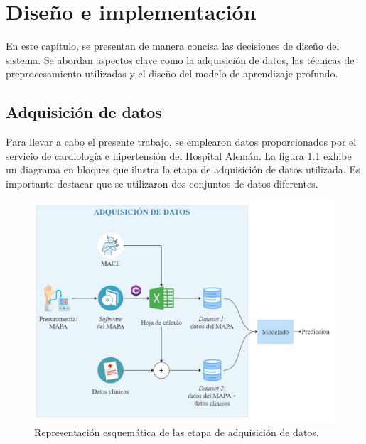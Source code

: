 \chapter{Diseño e implementación} %

\label{Chapter3} %

En este capítulo, se presentan de manera concisa las decisiones de diseño del sistema. 
Se abordan aspectos clave como la adquisición de datos, las técnicas de preprocesamiento 
utilizadas y el diseño del modelo de aprendizaje profundo. 

\section{Adquisición de datos}
 
\newcommand{\myhash}{\raisebox{\depth}{\#}}

Para llevar a cabo el presente trabajo, se emplearon datos proporcionados por el servicio 
de cardiología e hipertensión del Hospital Alemán. La figura \ref{fig:adquisicion_datos} 
exhibe un diagrama en bloques que ilustra la etapa de adquisición de datos utilizada. 
Es importante destacar que se utilizaron dos conjuntos de datos diferentes. 

\begin{figure}[ht]
	\centering
	\includegraphics[width=\textwidth]{./Figures/adquisicion_datos2.jpg}
	\caption{Representación esquemática de las etapa de adquisición de datos.}\label{fig:adquisicion_datos}
\end{figure}

